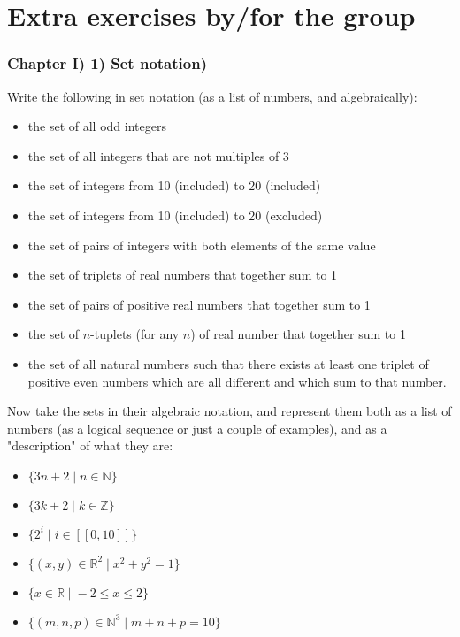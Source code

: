 \documentclass[12pt, letterpaper, twoside]{report}
\begin{document}
\part{Extra exercises by/for the group}

\section*{Chapter I) 1) Set notation)}

Write the following in set notation (as a list of numbers, and algebraically):
\begin{itemize}
	\item the set of all odd integers
	\item the set of all integers that are not multiples of 3
	\item the set of integers from 10 (included) to 20 (included)
	\item the set of integers from 10 (included) to 20 (excluded)
	\item the set of pairs of integers with both elements of the same value
	\item the set of triplets of real numbers that together sum to 1
	\item the set of pairs of positive real numbers that together sum to 1
	\item the set of $n$-tuplets (for any $n$) of real number that together sum to 1
	\item the set of all natural numbers such that there exists at least one triplet of positive even numbers which are all different and which sum to that number.
\end{itemize}

Now take the sets in their algebraic notation, and represent them both as a list of numbers (as a logical sequence or just a couple of examples), and as a "description" of what they are:

\begin{itemize}
	\item $\{3n + 2 \; | \; n \in \mathbb{N} \}$
	\item $\{3k + 2 \; | \; k \in \mathbb{Z} \}$
	\item $\{ 2^i \; | \; i \in [[0, 10]] \}$
	\item $\{ (x, y) \in \mathbb{R}^2 \; | \; x^2 + y^2 = 1 \}$
	\item $\{ x \in \mathbb{R} \; | \; -2 \leq x \leq 2 \}$
	\item $\{ (m, n, p) \in \mathbb{N}^3 \; | \; m + n + p = 10 \}$
\end{itemize}
\end{document}
